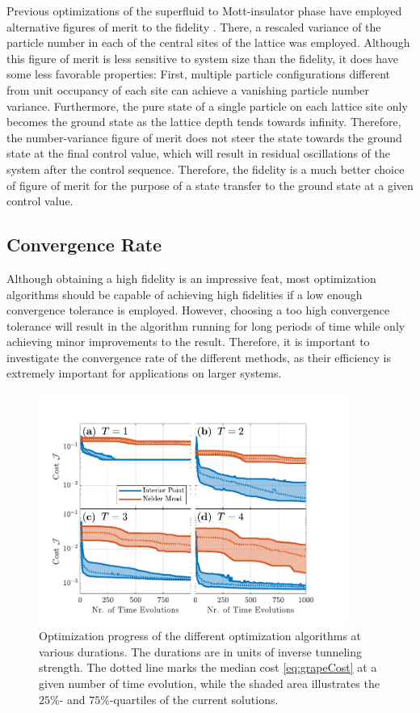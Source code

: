 Previous optimizations of the superfluid to Mott-insulator phase have employed alternative figures of merit to the fidelity \cite{Doria2011,FrankBloch}. There, a rescaled variance of the particle number in each of the central sites of the lattice was employed. Although this figure of merit is less sensitive to system size than the fidelity, it does have some less favorable properties: First, multiple particle configurations different from unit occupancy of each site can achieve a vanishing particle number variance. Furthermore, the pure state of a single particle on each lattice site only becomes the ground state as the lattice depth tends towards infinity. Therefore, the number-variance figure of merit does not steer the state towards the ground state at the final control value, which will result in residual oscillations of the system after the control sequence. Therefore, the fidelity is a much better choice of figure of merit for the purpose of a state transfer to the ground state at a given control value.


\subsection{Convergence Rate}
Although obtaining a high fidelity is an impressive feat, most optimization algorithms should be capable of achieving high fidelities if a low enough convergence tolerance is employed. However, choosing a too high convergence tolerance will result in the algorithm running for long periods of time while only achieving minor improvements to the result. Therefore, it is important to investigate the convergence rate of the different methods, as their efficiency is extremely important for applications on larger systems.
\begin{figure}[h!]
    \centering
    \includegraphics[width=0.9\textwidth]{Figures/L5/CostProgress.pdf}
    \caption{Optimization progress of the different optimization algorithms at various durations. The durations are in units of inverse tunneling strength. The dotted line marks the median cost \eqref{eq:grapeCost} at a given number of time evolution, while the shaded area illustrates the $25\%$- and $75\%$-quartiles of the current solutions.}
    \label{fig:CostProgress}
\end{figure}

